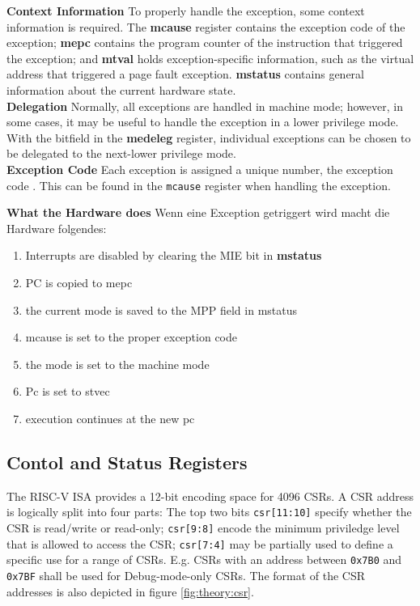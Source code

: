 
\textbf{Context Information} To properly handle the exception, some context information is required.
The \textbf{mcause} register contains the exception code of the exception; \textbf{mepc} contains
the program counter of the instruction that triggered the exception; and \textbf{mtval} holds
exception-specific information, such as the virtual address that triggered a page fault exception.
\textbf{mstatus} contains general information about the current hardware state.\\

\textbf{Delegation} Normally, all exceptions are handled in machine mode; however, in some cases,
it may be useful to handle the exception in a lower privilege mode. With the bitfield in the
\textbf{medeleg} register, individual exceptions can be chosen to be delegated to the next-lower
privilege mode.\\

\textbf{Exception Code} Each exception is assigned a unique number, the exception code \cite{riscvreader}.
This can be found in the \texttt{mcause} register when handling the exception.



\textbf{What the Hardware does} Wenn eine Exception getriggert wird macht die Hardware folgendes:
\begin{enumerate}
    \item Interrupts are disabled by clearing the MIE bit in \textbf{mstatus}
    \item PC is copied to mepc
    \item the current mode is saved to the MPP field in mstatus
    \item mcause is set to the proper exception code
    \item the mode is set to the machine mode
    \item Pc is set to stvec
    \item execution continues at the new pc
\end{enumerate}

\subsection{Contol and Status Registers}
The RISC-V ISA provides a 12-bit encoding space for 4096 CSRs. A CSR address is logically split
into four parts: The top two bits \texttt{csr[11:10]} specify whether the CSR is read/write or read-only;
\texttt{csr[9:8]} encode the minimum priviledge level that is allowed to access the CSR; \texttt{csr[7:4]}
may be partially used to define a specific use for a range of CSRs. E.g. CSRs with an address
between \texttt{0x7B0} and \texttt{0x7BF} shall be used for Debug-mode-only CSRs. The format
of the CSR addresses is also depicted in figure \ref{fig:theory:csr}.

